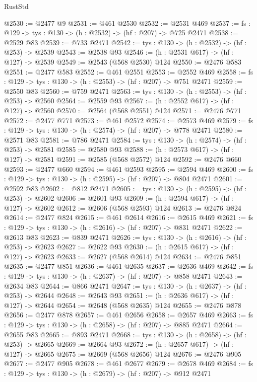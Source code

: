 \begin{lexlean}{RustStd}
\begin{coremodule}
@2530 := @2477 @9
@2531 := @461 @2530
@2532 := @2531 @469
@2537 := {fs : @129} -> {tys : @130} -> (h : @2532) -> (hf : @207) -> @725 @2471
@2538 := @2529 @83
@2539 := @733 @2471
@2542 := {tys : @130} -> (h : @2532) -> (hf : @253) -> @2539
@2543 := @2538 @93
@2546 := (h : @2531 @617) -> (hf : @127) -> @2539
@2549 := @2543 (@568 @2530) @124
@2550 := @2476 @583
@2551 := @2477 @583
@2552 := @461 @2551
@2553 := @2552 @469
@2558 := {fs : @129} -> {tys : @130} -> (h : @2553) -> (hf : @207) -> @751 @2471
@2559 := @2550 @83
@2560 := @759 @2471
@2563 := {tys : @130} -> (h : @2553) -> (hf : @253) -> @2560
@2564 := @2559 @93
@2567 := (h : @2552 @617) -> (hf : @127) -> @2560
@2570 := @2564 (@568 @2551) @124
@2571 := @2476 @771
@2572 := @2477 @771
@2573 := @461 @2572
@2574 := @2573 @469
@2579 := {fs : @129} -> {tys : @130} -> (h : @2574) -> (hf : @207) -> @778 @2471
@2580 := @2571 @83
@2581 := @786 @2471
@2584 := {tys : @130} -> (h : @2574) -> (hf : @253) -> @2581
@2585 := @2580 @93
@2588 := (h : @2573 @617) -> (hf : @127) -> @2581
@2591 := @2585 (@568 @2572) @124
@2592 := @2476 @660
@2593 := @2477 @660
@2594 := @461 @2593
@2595 := @2594 @469
@2600 := {fs : @129} -> {tys : @130} -> (h : @2595) -> (hf : @207) -> @804 @2471
@2601 := @2592 @83
@2602 := @812 @2471
@2605 := {tys : @130} -> (h : @2595) -> (hf : @253) -> @2602
@2606 := @2601 @93
@2609 := (h : @2594 @617) -> (hf : @127) -> @2602
@2612 := @2606 (@568 @2593) @124
@2613 := @2476 @824
@2614 := @2477 @824
@2615 := @461 @2614
@2616 := @2615 @469
@2621 := {fs : @129} -> {tys : @130} -> (h : @2616) -> (hf : @207) -> @831 @2471
@2622 := @2613 @83
@2623 := @839 @2471
@2626 := {tys : @130} -> (h : @2616) -> (hf : @253) -> @2623
@2627 := @2622 @93
@2630 := (h : @2615 @617) -> (hf : @127) -> @2623
@2633 := @2627 (@568 @2614) @124
@2634 := @2476 @851
@2635 := @2477 @851
@2636 := @461 @2635
@2637 := @2636 @469
@2642 := {fs : @129} -> {tys : @130} -> (h : @2637) -> (hf : @207) -> @858 @2471
@2643 := @2634 @83
@2644 := @866 @2471
@2647 := {tys : @130} -> (h : @2637) -> (hf : @253) -> @2644
@2648 := @2643 @93
@2651 := (h : @2636 @617) -> (hf : @127) -> @2644
@2654 := @2648 (@568 @2635) @124
@2655 := @2476 @878
@2656 := @2477 @878
@2657 := @461 @2656
@2658 := @2657 @469
@2663 := {fs : @129} -> {tys : @130} -> (h : @2658) -> (hf : @207) -> @885 @2471
@2664 := @2655 @83
@2665 := @893 @2471
@2668 := {tys : @130} -> (h : @2658) -> (hf : @253) -> @2665
@2669 := @2664 @93
@2672 := (h : @2657 @617) -> (hf : @127) -> @2665
@2675 := @2669 (@568 @2656) @124
@2676 := @2476 @905
@2677 := @2477 @905
@2678 := @461 @2677
@2679 := @2678 @469
@2684 := {fs : @129} -> {tys : @130} -> (h : @2679) -> (hf : @207) -> @912 @2471

\end{coremodule}
\end{lexlean}
